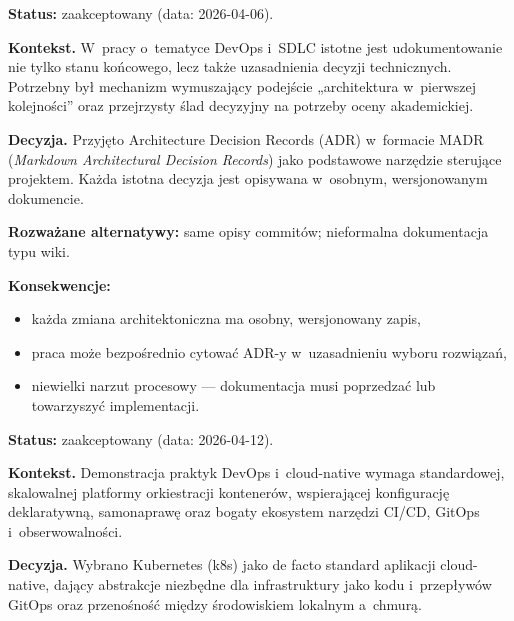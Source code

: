 \newpage



\textbf{Status:} zaakceptowany (data: 2026-04-06).

\textbf{Kontekst.} W~pracy o~tematyce DevOps i~SDLC istotne jest udokumentowanie nie tylko stanu końcowego, lecz także uzasadnienia decyzji technicznych. Potrzebny był mechanizm wymuszający podejście „architektura w~pierwszej kolejności” oraz przejrzysty ślad decyzyjny na potrzeby oceny akademickiej.

\textbf{Decyzja.} Przyjęto Architecture Decision Records (ADR) w~formacie MADR (\textit{Markdown Architectural Decision Records}) jako podstawowe narzędzie sterujące projektem. Każda istotna decyzja jest opisywana w~osobnym, wersjonowanym dokumencie.

\textbf{Rozważane alternatywy:} same opisy commitów; nieformalna dokumentacja typu wiki.

\textbf{Konsekwencje:}
\begin{itemize}
  \item[$+$] każda zmiana architektoniczna ma osobny, wersjonowany zapis,
  \item[$+$] praca może bezpośrednio cytować ADR-y w~uzasadnieniu wyboru rozwiązań,
  \item[$-$] niewielki narzut procesowy --- dokumentacja musi poprzedzać lub towarzyszyć implementacji.
\end{itemize}


\textbf{Status:} zaakceptowany (data: 2026-04-12).

\textbf{Kontekst.} Demonstracja praktyk DevOps i~cloud-native wymaga standardowej, skalowalnej platformy orkiestracji kontenerów, wspierającej konfigurację deklaratywną, samonaprawę oraz bogaty ekosystem narzędzi CI/CD, GitOps i~obserwowalności.

\textbf{Decyzja.} Wybrano Kubernetes (k8s) jako de facto standard aplikacji cloud-native, dający abstrakcje niezbędne dla infrastruktury jako kodu i~przepływów GitOps oraz przenośność między środowiskiem lokalnym a~chmurą.

